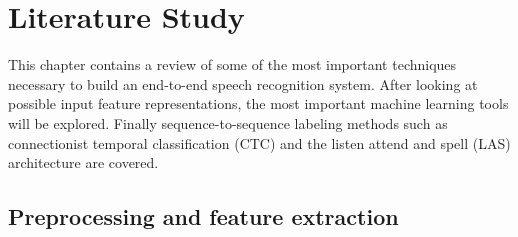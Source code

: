\chapter{Literature Study}
\label{cha:litreview}
This chapter contains a review of some of the most important techniques necessary to build an end-to-end speech recognition system. After looking at possible input feature representations, the most important machine learning tools will be explored. Finally sequence-to-sequence labeling methods such as connectionist temporal classification (CTC) and the listen attend and spell (LAS) architecture are covered.

\section{Preprocessing and feature extraction}
